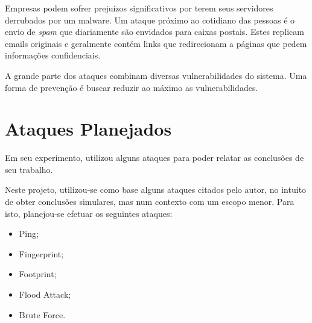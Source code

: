 		Empresas podem sofrer prejuízos significativos por terem seus servidores derrubados por um malware. Um ataque próximo ao cotidiano das pessoas é o envio de \textit{spam}  que diariamente são envidados para caixas postais. Estes replicam emails originais e geralmente contém links que redirecionam a páginas que pedem informações confidenciais. 

		A grande parte dos ataques combinam diversas vulnerabilidades do sistema.
		Uma forma de prevenção é buscar reduzir ao máximo as vulnerabilidades.


	\section{Ataques Planejados}
	\label{sec:Seguranca_Planejamento}

		Em seu experimento, \cite{Morais} utilizou alguns ataques para poder relatar as conclusões de seu trabalho.

		Neste projeto, utilizou-se como base alguns ataques citados pelo autor, no intuito de obter conclusões simulares, mas num contexto com um escopo menor. Para isto, planejou-se efetuar os seguintes ataques:

		\begin{itemize}
			\item Ping;
			\item Fingerprint;
			\item Footprint;
			\item Flood Attack;
			\item Brute Force.
		\end{itemize} 

